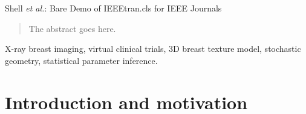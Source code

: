 \documentclass[journal]{IEEEtran}
\begin{document}
%
{Shell \MakeLowercase{\textit{et al.}}: Bare Demo of IEEEtran.cls for
  IEEE Journals}
%











\maketitle

\begin{abstract}
  The abstract goes here.
\end{abstract}

\begin{IEEEkeywords}
  X-ray breast imaging, virtual clinical trials, 3D breast texture
  model, stochastic geometry, statistical parameter inference.
\end{IEEEkeywords}






%
\IEEEpeerreviewmaketitle



\section{Introduction and motivation}
%
%
%
%
\end{document}
